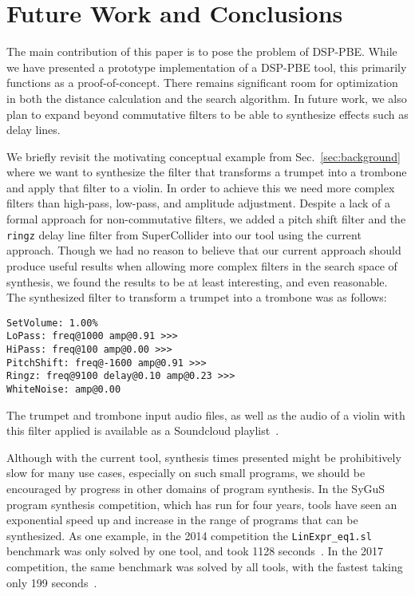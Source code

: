 \section{Future Work and Conclusions}

The main contribution of this paper is to pose the problem of DSP-PBE.
While we have presented a prototype implementation of a DSP-PBE tool, this primarily functions as a proof-of-concept.
There remains significant room for optimization in both the distance calculation and the search algorithm.
In future work, we also plan to expand beyond commutative filters to be able to synthesize effects such as delay lines.

We briefly revisit the motivating conceptual example from Sec.~\ref{sec:background} where we want to synthesize the filter that transforms a trumpet into a trombone and apply that filter to a violin.
In order to achieve this we need more complex filters than high-pass, low-pass, and amplitude adjustment.
Despite a lack of a formal approach for non-commutative filters, we added a pitch shift filter and the \texttt{ringz} delay line filter from SuperCollider into our tool using the current approach.
Though we had no reason to believe that our current approach should produce useful results when allowing more complex filters in the search space of synthesis, we found the results to be at least interesting, and even reasonable.
The synthesized filter to transform a trumpet into a trombone was as follows:

\begin{lstlisting}
SetVolume: 1.00% 
LoPass: freq@1000 amp@0.91 >>> 
HiPass: freq@100 amp@0.00 >>> 
PitchShift: freq@-1600 amp@0.91 >>> 
Ringz: freq@9100 delay@0.10 amp@0.23 >>> 
WhiteNoise: amp@0.00
\end{lstlisting}

The trumpet and trombone input audio files, as well as the audio of a violin with this filter applied is available as a Soundcloud playlist~\cite{soundcloudAudio}.

Although with the current tool, synthesis times presented might be prohibitively slow for many use cases, especially on such small programs, we should be encouraged by progress in other domains of program synthesis.
In the SyGuS program synthesis competition, which has run for four years, tools have seen an exponential speed up and increase in the range of programs that can be synthesized.
As one example, in the 2014 competition the \texttt{LinExpr\_eq1.sl} benchmark was only solved by one tool, and took 1128 seconds~\cite{sygus2014}.
In the 2017 competition, the same benchmark was solved by all tools, with the fastest taking only 199 seconds~\cite{sygus2017}.
